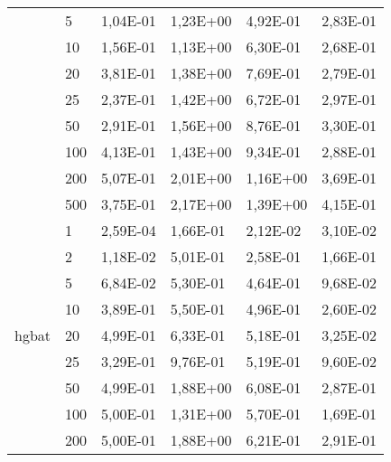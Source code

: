 \begin{longtable}[c]{|m{3.5cm}|l|l|l|l|l|}
                                        & 5         & 1,04E-01   & 1,23E+00   & 4,92E-01   & 2,83E-01  \\ \cline{2-6} 
                                        & 10        & 1,56E-01   & 1,13E+00   & 6,30E-01   & 2,68E-01  \\ \cline{2-6} 
                                        & 20        & 3,81E-01   & 1,38E+00   & 7,69E-01   & 2,79E-01  \\ \cline{2-6} 
                                        & 25        & 2,37E-01   & 1,42E+00   & 6,72E-01   & 2,97E-01  \\ \cline{2-6} 
                                        & 50        & 2,91E-01   & 1,56E+00   & 8,76E-01   & 3,30E-01  \\ \cline{2-6} 
                                        & 100       & 4,13E-01   & 1,43E+00   & 9,34E-01   & 2,88E-01  \\ \cline{2-6} 
                                        & 200       & 5,07E-01   & 2,01E+00   & 1,16E+00   & 3,69E-01  \\ \cline{2-6} 
                                        & 500       & 3,75E-01   & 2,17E+00   & 1,39E+00   & 4,15E-01  \\ \hline
\multirow{10}{*}{hgbat}                 & 1         & 2,59E-04   & 1,66E-01   & 2,12E-02   & 3,10E-02  \\ \cline{2-6} 
                                        & 2         & 1,18E-02   & 5,01E-01   & 2,58E-01   & 1,66E-01  \\ \cline{2-6} 
                                        & 5         & 6,84E-02   & 5,30E-01   & 4,64E-01   & 9,68E-02  \\ \cline{2-6} 
                                        & 10        & 3,89E-01   & 5,50E-01   & 4,96E-01   & 2,60E-02  \\ \cline{2-6} 
                                        & 20        & 4,99E-01   & 6,33E-01   & 5,18E-01   & 3,25E-02  \\ \cline{2-6} 
                                        & 25        & 3,29E-01   & 9,76E-01   & 5,19E-01   & 9,60E-02  \\ \cline{2-6} 
                                        & 50        & 4,99E-01   & 1,88E+00   & 6,08E-01   & 2,87E-01  \\ \cline{2-6} 
                                        & 100       & 5,00E-01   & 1,31E+00   & 5,70E-01   & 1,69E-01  \\ \cline{2-6} 
                                        & 200       & 5,00E-01   & 1,88E+00   & 6,21E-01   & 2,91E-01  \\ \cline{2-6} 

\end{longtable}
